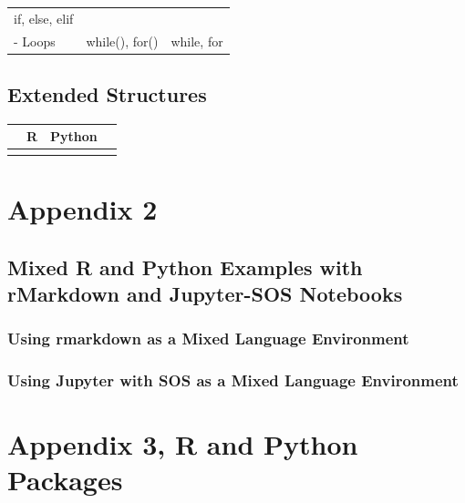 \documentclass[]{book}
\theoremstyle{definition}
\theoremstyle{definition}
\theoremstyle{definition}
\theoremstyle{remark}
\begin{document}
\begin{longtable}[]{@{}lll@{}}
\begin{minipage}[t]{0.39\columnwidth}
if, else, elif\strut
\end{minipage}\tabularnewline
\begin{minipage}[t]{0.19\columnwidth}\raggedright\strut
- Loops\strut
\end{minipage} & \begin{minipage}[t]{0.33\columnwidth}\raggedright\strut
while(), for()\strut
\end{minipage} & \begin{minipage}[t]{0.39\columnwidth}\raggedright\strut
while, for\strut
\end{minipage}\tabularnewline
\bottomrule
\end{longtable}

\section{Extended Structures}\label{extended-structures}

\begin{longtable}[]{@{}llll@{}}
\toprule
& R & Python &\tabularnewline
\midrule
\endhead
& & &\tabularnewline
\bottomrule
\end{longtable}

\chapter{Appendix 2}\label{appendix-2}

\section{Mixed R and Python Examples with rMarkdown and Jupyter-SOS
Notebooks}\label{mixed-r-and-python-examples-with-rmarkdown-and-jupyter-sos-notebooks}

\subsection{Using rmarkdown as a Mixed Language
Environment}\label{using-rmarkdown-as-a-mixed-language-environment}

\subsection{Using Jupyter with SOS as a Mixed Language
Environment}\label{using-jupyter-with-sos-as-a-mixed-language-environment}

\chapter{Appendix 3, R and Python
Packages}\label{appendix-3-r-and-python-packages}
\end{document}
